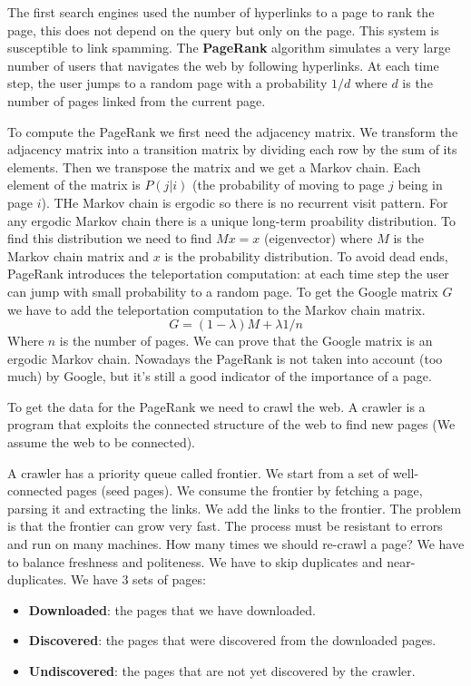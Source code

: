 The first search engines used the number of hyperlinks to a page
to rank the page, this does not depend on the query but only
on the page. This system is susceptible to link spamming.
The \textbf{PageRank} algorithm simulates a very large number 
of users that navigates the web by following hyperlinks.
At each time step, the user jumps to a random page with
a probability $1/d$ where $d$ is the number of pages linked
from the current page.

To compute the PageRank we first need the adjacency matrix.
We transform the adjacency matrix into a transition matrix
by dividing each row by the sum of its elements.
Then we transpose the matrix and we get a Markov chain.
Each element of the matrix is $P(j|i)$ (the probability of
moving to page $j$ being in page $i$).
THe Markov chain is ergodic so there is no recurrent visit
pattern.
For any ergodic Markov chain there is a unique long-term
proability distribution.
To find this distribution we need to find $Mx=x$ (eigenvector)
where $M$ is the Markov chain matrix and $x$ is the probability
distribution.
To avoid dead ends, PageRank introduces the teleportation
computation: at each time step the user can jump with
small probability to a random page.
To get the Google matrix $G$ we have to add the teleportation
computation to the Markov chain matrix.
\[
    G = (1-\lambda)M + \lambda 1/n
\]
Where $n$ is the number of pages.
We can prove that the Google matrix is an ergodic Markov chain.
Nowadays the PageRank is not taken into account (too much) by
Google, but it's still a good indicator of the importance of
a page.

To get the data for the PageRank we need to crawl the web.
A crawler is a program that exploits the connected structure
of the web to find new pages (We assume the web to be connected).

A crawler has a priority queue called frontier.
We start from a set of well-connected pages (seed pages).
We consume the frontier by fetching a page, parsing it and
extracting the links. We add the links to the frontier.
The problem is that the frontier can grow very fast.
The process must be resistant to errors and run on many machines.
How many times we should re-crawl a page? We have to balance 
freshness and politeness. We have to skip duplicates and
near-duplicates.
We have 3 sets of pages: 
\begin{itemize}
    \item \textbf{Downloaded}: the pages that we have downloaded.
    \item \textbf{Discovered}: the pages that were discovered from
    the downloaded pages.
    \item \textbf{Undiscovered}: the pages that are not yet
    discovered by the crawler.
\end{itemize}

